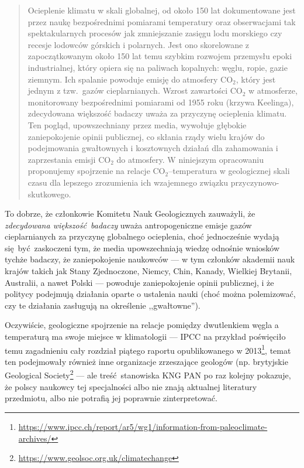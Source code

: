 \documentclass[12pt]{article}
\begin{document}
\begin{quotation}
	Ocieplenie klimatu w skali globalnej, od około 150 lat dokumentowane jest przez naukę bezpośrednimi pomiarami temperatury oraz obserwacjami tak spektakularnych procesów jak zmniejszanie zasięgu lodu morskiego czy recesje lodowców górskich i polarnych. Jest ono skorelowane z zapoczątkowanym około 150 lat temu szybkim rozwojem przemysłu epoki industrialnej, który opiera się na paliwach kopalnych: węglu, ropie, gazie ziemnym. Ich spalanie powoduje emisję do atmosfery CO$_2$, który jest jednym z tzw.~gazów cieplarnianych. Wzrost zawartości CO$_2$ w atmosferze, monitorowany bezpośrednimi pomiarami od 1955 roku (krzywa Keelinga), zdecydowana większość badaczy uważa za przyczynę ocieplenia klimatu. Ten pogląd, upowszechniany przez media, wywołuje głębokie zaniepokojenie opinii publicznej, co skłania rządy wielu krajów do podejmowania gwałtownych i kosztownych działań dla zahamowania i zaprzestania emisji CO$_2$ do atmosfery. W niniejszym opracowaniu proponujemy spojrzenie na relacje CO$_2$--temperatura w geologicznej skali czasu dla lepszego zrozumienia ich wzajemnego związku przyczynowo-skutkowego.
\end{quotation}

To dobrze, że członkowie Komitetu Nauk Geologicznych zauważyli, że \emph{zdecydowana większość badaczy} uważa antropogeniczne emisje gazów cieplarnianych za przyczynę globalnego ocieplenia, choć jednocześnie wydają się być zaskoczeni tym, że media upowszechniają wiedzę odnośnie wniosków tychże badaczy, że zaniepokojenie naukowców --- w tym członków akademii nauk krajów takich jak Stany Zjednoczone, Niemcy, Chin, Kanady, Wielkiej Brytanii, Australii, a nawet Polski --- powoduje zaniepokojenie opinii publicznej, i że politycy podejmują działania oparte o ustalenia nauki (choć można polemizować, czy te działania zasługują na określenie ,,gwałtowne'').

Oczywiście, geologiczne spojrzenie na relacje pomiędzy dwutlenkiem węgla a temperaturą ma swoje miejsce w klimatologii --- IPCC na przykład poświęciło temu zagadnieniu cały rozdział piątego raportu opublikowanego w 2013\footnote{\url{https://www.ipcc.ch/report/ar5/wg1/information-from-paleoclimate-archives/}}, temat ten podejmowały również inne organizacje zrzeszające geologów (np. brytyjskie Geological Society\footnote{\url{https://www.geolsoc.org.uk/climatechange}} --- ale treść stanowiska KNG PAN po raz kolejny pokazuje, że polscy naukowcy tej specjalności albo nie znają aktualnej literatury przedmiotu, albo nie potrafią jej poprawnie zinterpretować.
\end{document}
